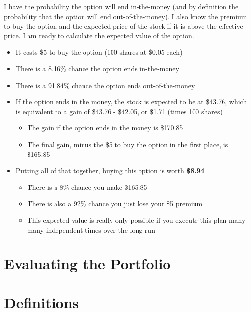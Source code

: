 \documentclass[
]{book}
\providecommand{\tightlist}{%
  \setlength{\itemsep}{0pt}\setlength{\parskip}{0pt}}
\begin{document}
I have the probability the option will end in-the-money (and by definition the
probability that the option will end out-of-the-money). I also know the premium
to buy the option and the expected price of the stock if it is above the
effective price. I am ready to calculate the expected value of the option.

\begin{itemize}
\tightlist
\item
  It costs \$5 to buy the option (100 shares at \$0.05 each)
\item
  There is a 8.16\% chance
  the option ends in-the-money
\item
  There is a 91.84\% chance the option ends
  out-of-the-money
\item
  If the option ends in the money, the stock is expected to be at
  \$43.76, which is equivalent to a gain of \$43.76 -
  \$42.05, or \$1.71 (times 100 shares)

  \begin{itemize}
  \tightlist
  \item
    The gain if the option ends in the money is \$170.85
  \item
    The final gain, minus the \$5 to buy the option in the first place, is
    \$165.85
  \end{itemize}
\item
  Putting all of that together, buying this option is worth
  \textbf{\$8.94}

  \begin{itemize}
  \tightlist
  \item
    There is a 8\% chance you make \$165.85
  \item
    There is also a 92\% chance you just lose your \$5 premium
  \item
    This expected value is really only possible if you execute this plan
    many many independent times over the long run
  \end{itemize}
\end{itemize}

\hypertarget{evaluating-the-portfolio}{%
\chapter{Evaluating the Portfolio}\label{evaluating-the-portfolio}}

\hypertarget{appendix-appendix}{%
\appendix}


\hypertarget{def}{%
\chapter{Definitions}\label{def}}
\end{document}
